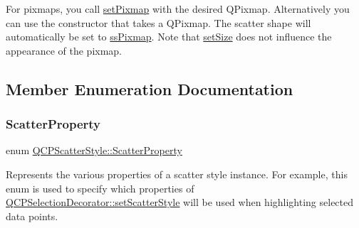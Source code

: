 For pixmaps, you call \mbox{\hyperlink{class_q_c_p_scatter_style_a5fb611d46acfac520d7b89a1c71d9246}{set\+Pixmap}} with the desired Q\+Pixmap. Alternatively you can use the constructor that takes a Q\+Pixmap. The scatter shape will automatically be set to \mbox{\hyperlink{class_q_c_p_scatter_style_adb31525af6b680e6f1b7472e43859349a8718b849ca7c307b07b8e091efb0c31e}{ss\+Pixmap}}. Note that \mbox{\hyperlink{class_q_c_p_scatter_style_aaefdd031052892c4136129db68596e0f}{set\+Size}} does not influence the appearance of the pixmap. 

\subsection{Member Enumeration Documentation}
\mbox{\label{class_q_c_p_scatter_style_a8974f6a20f8f6eea7781f0e6af9deb46}} 
\subsubsection{\texorpdfstring{Scatter\+Property}{ScatterProperty}}
{\footnotesize\ttfamily enum \mbox{\hyperlink{class_q_c_p_scatter_style_a8974f6a20f8f6eea7781f0e6af9deb46}{Q\+C\+P\+Scatter\+Style\+::\+Scatter\+Property}}}

Represents the various properties of a scatter style instance. For example, this enum is used to specify which properties of \mbox{\hyperlink{class_q_c_p_selection_decorator_ab403a613289714ff4fd4a0c0371ab116}{Q\+C\+P\+Selection\+Decorator\+::set\+Scatter\+Style}} will be used when highlighting selected data points.

